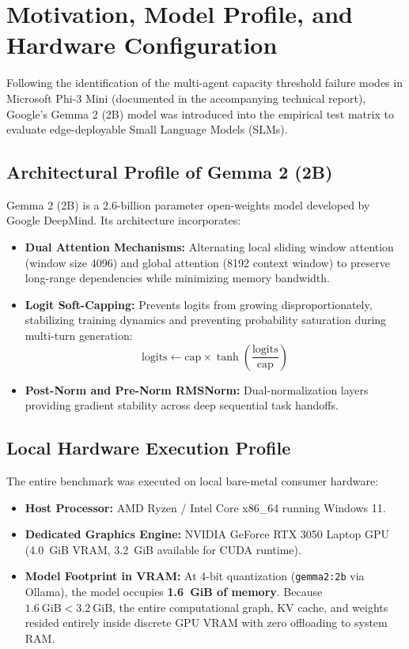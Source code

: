 \documentclass[10pt,a4paper]{article}
\begin{document}
\vspace{0.5em}

\section{Motivation, Model Profile, and Hardware Configuration}

Following the identification of the multi-agent capacity threshold failure modes in Microsoft Phi-3 Mini (documented in the accompanying technical report), Google's Gemma 2 (2B) model was introduced into the empirical test matrix to evaluate edge-deployable Small Language Models (SLMs).

\subsection{Architectural Profile of Gemma 2 (2B)}
Gemma 2 (2B) is a 2.6-billion parameter open-weights model developed by Google DeepMind. Its architecture incorporates:
\begin{itemize}
    \item \textbf{Dual Attention Mechanisms:} Alternating local sliding window attention (window size 4096) and global attention (8192 context window) to preserve long-range dependencies while minimizing memory bandwidth.
    \item \textbf{Logit Soft-Capping:} Prevents logits from growing disproportionately, stabilizing training dynamics and preventing probability saturation during multi-turn generation:
    \begin{equation}
        \text{logits} \leftarrow \text{cap} \times \tanh\left(\frac{\text{logits}}{\text{cap}}\right)
    \end{equation}
    \item \textbf{Post-Norm and Pre-Norm RMSNorm:} Dual-normalization layers providing gradient stability across deep sequential task handoffs.
\end{itemize}

\subsection{Local Hardware Execution Profile}
The entire benchmark was executed on local bare-metal consumer hardware:
\begin{itemize}
    \item \textbf{Host Processor:} AMD Ryzen / Intel Core x86\_64 running Windows 11.
    \item \textbf{Dedicated Graphics Engine:} NVIDIA GeForce RTX 3050 Laptop GPU (4.0~GiB VRAM, 3.2~GiB available for CUDA runtime).
    \item \textbf{Model Footprint in VRAM:} At 4-bit quantization (\texttt{gemma2:2b} via Ollama), the model occupies \textbf{1.6~GiB of memory}. Because $1.6~\text{GiB} < 3.2~\text{GiB}$, the entire computational graph, KV cache, and weights resided entirely inside discrete GPU VRAM with zero offloading to system RAM.
\end{itemize}
\end{document}
